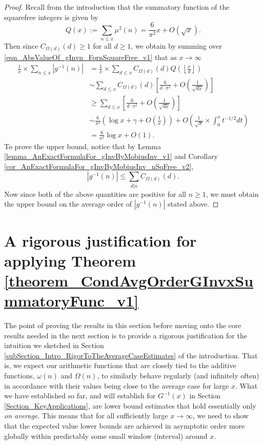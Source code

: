 \documentclass[11pt,reqno,a4letter]{article}
\numberwithin{figure}{section}
\numberwithin{table}{section}
\newcommand{\Floor}[2]{\ensuremath{\left\lfloor \frac{#1}{#2} \right\rfloor}}
\theoremstyle{plain}
\numberwithin{theorem}{section}
\theoremstyle{definition}
\begin{document}
\begin{proof}
Recall from the introduction that the summatory function of the 
squarefree integers is given by 
\[
Q(x) := \sum_{n \leq x} \mu^2(n) = \frac{6}{\pi^2} x + O(\sqrt{x}). 
\]
Then since $C_{\Omega(d)}(d) \geq 1$ for all $d \geq 1$, we obtain by summing over 
\eqref{eqn_AbsValueOf_gInvn_FornSquareFree_v1} that as $x \rightarrow \infty$ 
\begin{align*} 
\frac{1}{x} \times \sum_{n \leq x} |g^{-1}(n)| & = \frac{1}{x} \times \sum_{d \leq x} 
     C_{\Omega(d)}(d) Q\left(\Floor{x}{d}\right) \\ 
     & \sim \sum_{d \leq x} C_{\Omega(d)}(d) \left[\frac{6}{d \cdot \pi^2} + O\left(\frac{1}{\sqrt{dx}}\right) 
     \right] \\ 
     & \geq \sum_{d \leq x} \left[\frac{6}{d \cdot \pi^2} + O\left(\frac{1}{\sqrt{dx}}\right)\right] \\ 
     & \sim \frac{6}{\pi^2}\left(\log x + \gamma + O\left(\frac{1}{x}\right)\right) + 
     O\left(\frac{1}{\sqrt{x}} \times \int_0^{x} t^{-1/2} dt\right) \\ 
     & = \frac{6}{\pi^2} \log x + O(1). 
\end{align*} 
To prove the upper bound, notice that by 
Lemma \ref{lemma_AnExactFormulaFor_gInvByMobiusInv_v1} and 
Corollary \ref{cor_AnExactFormulaFor_gInvByMobiusInv_nSqFree_v2}, 
\[
|g^{-1}(n)| \leq \sum_{d|n} C_{\Omega(d)}(d). 
\]
Now since both of the above quantities are positive for all $n \geq 1$, 
we must obtain the upper bound on the average order of $|g^{-1}(n)|$
stated above. 
\end{proof} 

\newpage 
\section{A rigorous justification for applying Theorem \ref{theorem_CondAvgOrderGInvxSummatoryFunc_v1}} 
\label{Section_ProofOfValidityOfAverageOrderLowerBounds} 

The point of proving the results in this section before moving onto the core results needed in 
the next section is to provide a rigorous justification for the intuition we sketched in 
Section \ref{subSection_Intro_RigorToTheAverageCaseEstimates} of the introduction. 
That is, we expect our arithmetic functions that are closely 
tied to the additive functions, $\omega(n)$ and $\Omega(n)$, to similarly behave regularly (and 
infinitely often) in accordance with their values being close to the average case for large $x$. 
What we have established so far, and will establish for $G^{-1}(x)$ in 
Section \ref{Section_KeyApplications}, are lower bound estimates that hold essentially only 
\emph{on average}. 
This means that for all sufficiently large $x \rightarrow \infty$, 
we need to show that the expected value lower bounds 
are achieved in asymptotic order more globally 
within predictably some small window (interval) around $x$. 
\end{document}
